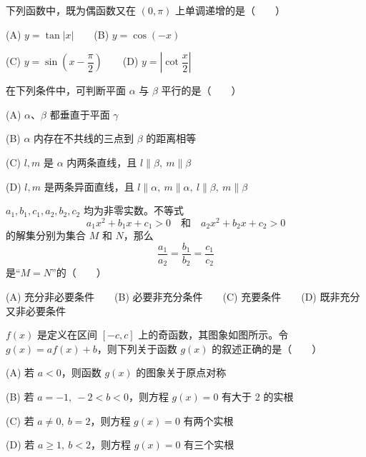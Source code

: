 \begin{question}
下列函数中，既为偶函数又在 \((0,\pi)\) 上单调递增的是\mbox{（　　）}

    (A) \(y=\tan|x|\)　　(B) \(y=\cos(-x)\)

    (C) \(y=\sin\left(x-\dfrac{\pi}{2}\right)\)　　(D) \(y=\left|\cot\dfrac{x}{2}\right|\)

\end{question}
\begin{question}
在下列条件中，可判断平面 \(\alpha\) 与 \(\beta\) 平行的是\mbox{（　　）}

    (A) \(\alpha\text{、}\beta\) 都垂直于平面 \(\gamma\)

    (B) \(\alpha\) 内存在不共线的三点到 \(\beta\) 的距离相等

    (C) \(l,m\) 是 \(\alpha\) 内两条直线，且 \(l\parallel\beta,\ m\parallel\beta\)

    (D) \(l,m\) 是两条异面直线，且 \(l\parallel\alpha,\ m\parallel\alpha,\ l\parallel\beta,\ m\parallel\beta\)

\end{question}
\begin{question}
\(a_1,b_1,c_1,a_2,b_2,c_2\) 均为非零实数。不等式
\nopagebreak[4]
\[
    a_1x^2+b_1x+c_1>0\quad\text{和}\quad a_2x^2+b_2x+c_2>0
\]
    的解集分别为集合 \(M\) 和 \(N\)，那么
\nopagebreak[4]
\[
    \frac{a_1}{a_2}=\frac{b_1}{b_2}=\frac{c_1}{c_2}
\]
    是“\(M=N\)”的\mbox{（　　）}

    (A) 充分非必要条件　　(B) 必要非充分条件　　(C) 充要条件　　(D) 既非充分又非必要条件

\Needspace{0.4\textheight}
\end{question}
\begin{question}
\(f(x)\) 是定义在区间 \([-c,c]\) 上的奇函数，其图象如图所示。令 \(g(x)=af(x)+b\)，则下列关于函数 \(g(x)\) 的叙述正确的是\mbox{（　　）}

    (A) 若 \(a<0\)，则函数 \(g(x)\) 的图象关于原点对称

    (B) 若 \(a=-1,\ -2<b<0\)，则方程 \(g(x)=0\) 有大于 2 的实根

    (C) 若 \(a\ne0,\ b=2\)，则方程 \(g(x)=0\) 有两个实根

    (D) 若 \(a\ge1,\ b<2\)，则方程 \(g(x)=0\) 有三个实根
\nopagebreak[4]
\begin{center}\end{center}
\nopagebreak[4]
\end{question}


